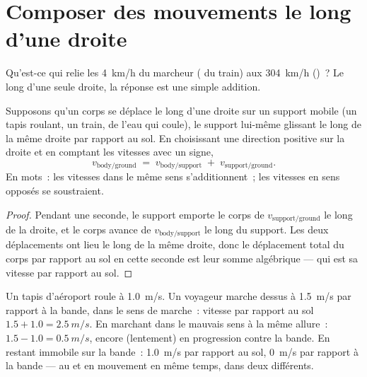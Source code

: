\section{Composer des mouvements le long d'une droite}

Qu'est-ce qui relie les \qty{4}{km/h} du marcheur ( du train)
aux \qty{304}{km/h} ()~? Le long d'une seule
droite, la réponse est une simple addition.

\begin{proposition}\label{prop:g10:relative-motion:compose}
Supposons qu'un corps se déplace le long d'une droite sur un support
mobile (un tapis roulant, un train, de l'eau qui coule), le support
lui-même glissant le long de la même droite par rapport au sol. En
choisissant une direction positive sur la droite et en comptant les
vitesses avec un signe,
\[
v_{\text{body/ground}} \;=\; v_{\text{body/support}} \;+\;
v_{\text{support/ground}} .
\]
En mots~: les vitesses dans le même sens s'additionnent~; les vitesses
en sens opposés se soustraient.
\end{proposition}

\begin{proof}
Pendant une seconde, le support emporte le corps de
$v_{\text{support/ground}}$  le long de la droite, et
le corps avance de $v_{\text{body/support}}$
 le long du support. Les deux déplacements ont lieu
le long de la même droite, donc le déplacement total du corps par
rapport au sol en cette seconde est leur somme algébrique --- qui est
sa vitesse par rapport au sol.
\end{proof}

\begin{example}\label{ex:g10:relative-motion:walkway}
Un tapis d'aéroport roule à \qty{1.0}{m/s}. Un voyageur marche dessus
à \qty{1.5}{m/s} par rapport à la bande, dans le sens de marche~:
vitesse par rapport au sol $1.5 + 1.0 = \qty{2.5}{m/s}$. En marchant
dans le mauvais sens à la même allure~: $1.5 - 1.0 = \qty{0.5}{m/s}$,
encore (lentement) en progression contre la bande. En restant immobile
sur la bande~: \qty{1.0}{m/s} par rapport au sol, \qty{0}{m/s} par
rapport à la bande --- au  et en mouvement en même temps,
dans deux  différents.
\end{example}

